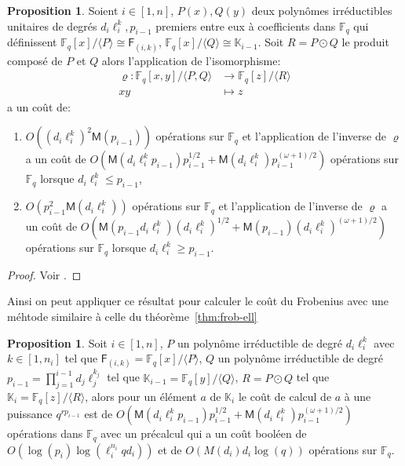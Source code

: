 \documentclass[10pt,a4paper]{book}
\theoremstyle{plain}
\theoremstyle{definition}
\theoremstyle{definition}
\theoremstyle{definition}
\newtheorem{prop}[thm]{Proposition}
\theoremstyle{definition}
\theoremstyle{remark}
\theoremstyle{remark}
\theoremstyle{definition}
\begin{document}
\begin{prop}
\label{pro:iso:fie}
Soient $i \in [1,n]$, $P(x),Q(y)$ deux polynômes irréductibles unitaires de degrés 
$d_i\ell_i^{k},p_{i-1}$ premiers entre eux à coefficients dans $\mathbb{F}_q$
qui définissent $\mathbb{F}_q[x]/\langle P \rangle \cong \mathsf{F}_{(i,k)}$,
$\mathbb{F}_q[x]/\langle Q \rangle \cong \mathbb{K}_{i-1}$. Soit $R=P \odot 
Q$ le produit composé de $P$ et $Q$ alors l'application de l'isomorphisme:
\begin{equation*}
\begin{alignedat}{1}
\varrho : \mathbb{F}_q[x,y]/\langle P, Q \rangle & \rightarrow \mathbb{F}_q[z]/\langle R \rangle \\
xy & \mapsto z
\end{alignedat}
\end{equation*}
a un coût de:
\begin{enumerate}
\item $O((d_i\ell_i^{k})^2\mathsf{M}(p_{i-1}))$ opérations sur $\mathbb{F}_q$
 et l'application de l'inverse de $\varrho$ a un coût de 
 $O(\mathsf{M}(d_i\ell_i^{k}p_{i-1})p_{i-1}^{1/2}+\mathsf{M}(d_i\ell_i^{k})p_{i-1}^{(\omega+1)/2})$ 
opérations sur $\mathbb{F}_q$ lorsque 
$d_i\ell_i^{k} \leqslant p_{i-1}$,
\item $O(p_{i-1}^2\mathsf{M}(d_i\ell_i^{k}))$ opérations sur $\mathbb{F}_q$ 
et l'application de l'inverse de $\varrho$ a un coût de 
$O(\mathsf{M}(p_{i-1}d_i\ell_i^{k})(d_i\ell_i^{k})^{1/2}+\mathsf{M}(p_{i-1})(d_i\ell_i^{k})^{(\omega+1)/2})$ 
opérations sur $\mathbb{F}_q$ lorsque $d_i\ell_i^{k} \geqslant p_{i-1}$.
\end{enumerate}
\end{prop}
\begin{proof}
Voir \cite{DeFeoDoliskaniSchost14}.
\end{proof}

Ainsi on peut appliquer ce résultat pour calculer le coût du Frobenius avec 
une méhtode similaire à celle du théorème~\ref{thm:frob-ell}
\begin{prop}
\label{pro:fro:com}
Soit $i \in [1,n]$, $P$ un polynôme irréductible de degré $d_i\ell_i^{k}$ avec 
$k \in [1,n_i]$ tel que $\mathsf{F}_{(i,k)}=\mathbb{F}_q[x]/\langle P \rangle$,
$Q$ un polynôme irréductible de degré $p_{i-1}=\prod_{j=1}^{i-1}d_j\ell_j^{k_j}$
tel que $\mathbb{K}_{i-1}=\mathbb{F}_q[y]/\langle Q \rangle$, $R=P \odot Q$ 
tel que  $\mathbb{K}_{i}=\mathbb{F}_q[z]/\langle R\rangle$, alors pour un 
élément $a$ de $\mathbb{K}_{i}$ le coût de calcul de $a$ à une puissance 
$q^{r p_{i-1}}$ est de 
$O(\mathsf{M}(d_i\ell_i^{k}p_{i-1})p_{i-1}^{1/2}+\mathsf{M}(d_i\ell_i^{k})p_{i-1}^{(\omega+1)/2})$ 
opérations dans $\mathbb{F}_q$ avec un 
précalcul qui a un coût booléen de $O(\log(p_{i})\log(\ell_i^{n_i}qd_i))$ et  
de $O( M(d_i) d_i\log(q))$ opérations sur $\mathbb{F}_q$.
\end{prop}
\end{document}
